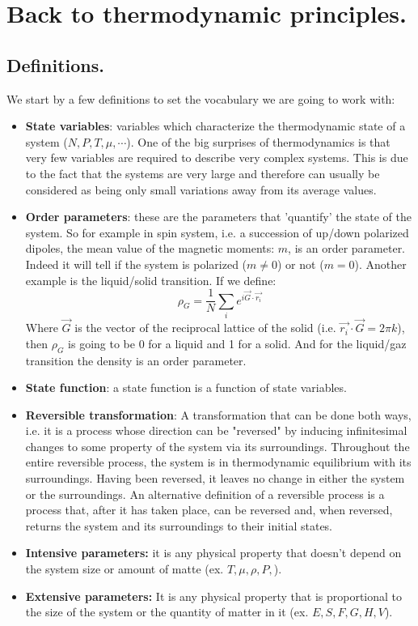 \documentclass[10pt,a4paper]{book}
\begin{document}
\section{Back to thermodynamic principles.}
\subsection{Definitions.}
We start by a few definitions to set the vocabulary we are going to work with:
\begin{itemize}
\item \textbf{State variables}: variables which characterize the thermodynamic state of a system ($N, P, T, \mu, \cdots$). One of the big surprises of thermodynamics is that very few variables are required to describe very complex systems. This is due to the fact that the systems are very large and therefore can usually be considered as being only small variations away from its average values.
\item \textbf{Order parameters}: these are the parameters that 'quantify' the state of the system. So for example in spin system, i.e. a succession of up/down polarized dipoles, the mean value of the magnetic moments: $m$, is an order parameter. Indeed it will tell if the system is polarized ($m \neq 0$) or not ($m = 0$). Another example is the liquid/solid transition. If we define:
\[
\rho_G = \frac{1}{N}\sum_i e^{i \vec{G} \cdot \vec{r_i}}
\]
Where $\vec{G}$ is the vector of the reciprocal lattice of the solid (i.e. $\vec{r_i}\cdot \vec{G} = 2\pi k$), then $\rho_G$ is going to be 0 for a liquid and 1 for a solid. And for the liquid/gaz transition the density is an order parameter.
\item \textbf{State function}: a state function is a function of state variables.
\item \textbf{Reversible transformation}: A transformation that can be done both ways, i.e. it is a process whose direction can be "reversed" by inducing infinitesimal changes to some property of the system via its surroundings. Throughout the entire reversible process, the system is in thermodynamic equilibrium with its surroundings. Having been reversed, it leaves no change in either the system or the surroundings. An alternative definition of a reversible process is a process that, after it has taken place, can be reversed and, when reversed, returns the system and its surroundings to their initial states. 
\item 
\textbf{Intensive parameters:} it is any physical property that doesn't depend on the system size or amount of matte (ex. $T,\mu,\rho,P,$).
\item\textbf{Extensive parameters:} It is any physical property that is proportional to the size of the system or the quantity of matter in it (ex. $E,S,F,G,H,V$).
\end{itemize}
\end{document}
